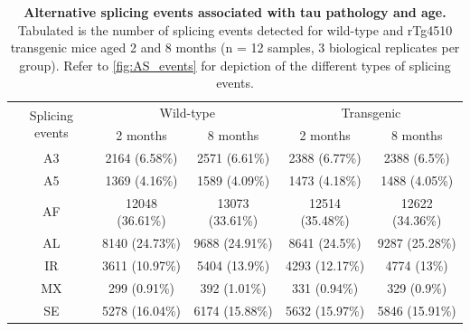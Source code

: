 \vspace{2cm}
\begin{table}[!htp]
	\centering
	\captionsetup{width=1\textwidth}
	\caption[Alternative splicing events associated with tau pathology and age]%
	{\textbf{Alternative splicing events associated with tau pathology and age.} Tabulated is the number of splicing events detected for wild-type and rTg4510 transgenic mice aged 2 and 8 months (n = 12 samples, 3 biological replicates per group). Refer to \cref{fig:AS_events} for depiction of the different types of splicing events.}
	\begin{tabular}{@{}ccccc@{}}
		\toprule
		\multirow{2}{*}{Splicing  events} & \multicolumn{2}{c}{Wild-type} & \multicolumn{2}{c}{Transgenic} \\ \cmidrule(l){2-5} 
		& 2 months        & 8 months        & 2 months        & 8 months        \\ \midrule
		A3 & 2164 (6.58\%)   & 2571 (6.61\%)   & 2388 (6.77\%)   & 2388 (6.5\%)    \\
		A5 & 1369 (4.16\%)   & 1589 (4.09\%)   & 1473 (4.18\%)   & 1488 (4.05\%)   \\
		AF & 12048 (36.61\%) & 13073 (33.61\%) & 12514 (35.48\%) & 12622 (34.36\%) \\
		AL & 8140 (24.73\%)  & 9688 (24.91\%)  & 8641 (24.5\%)   & 9287 (25.28\%)  \\
		IR & 3611 (10.97\%)  & 5404 (13.9\%)   & 4293 (12.17\%)  & 4774 (13\%)     \\
		MX & 299 (0.91\%)    & 392 (1.01\%)    & 331 (0.94\%)    & 329 (0.9\%)     \\
		SE & 5278 (16.04\%)  & 6174 (15.88\%)  & 5632 (15.97\%)  & 5846 (15.91\%)  \\ \bottomrule
	\end{tabular}
	\label{AS_WholeTranscriptome_diff}
\end{table}


